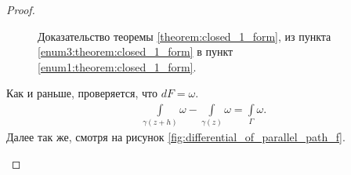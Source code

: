 \documentclass[../complex-analysis.tex]{subfiles}
\begin{document}
\begin{proof}
\begin{itemize}
\begin{figure}[h]
\caption{Доказательство теоремы \eqref{theorem:closed_1_form}, из пункта \ref{enum3:theorem:closed_1_form} в пункт \ref{enum1:theorem:closed_1_form}.}
\end{figure}


 Как и раньше, проверяется, что $dF = \omega$.
  \begin{align*}
   \int\limits_{\gamma(z+h)}  \omega - \int\limits_{\gamma(z)}  \omega = \int\limits_{\Gamma} \omega. 
  \end{align*} Далее так же, смотря на рисунок \eqref{fig:differential_of_parallel_path_f}.
 \end{itemize}
\end{proof}
\end{document}
